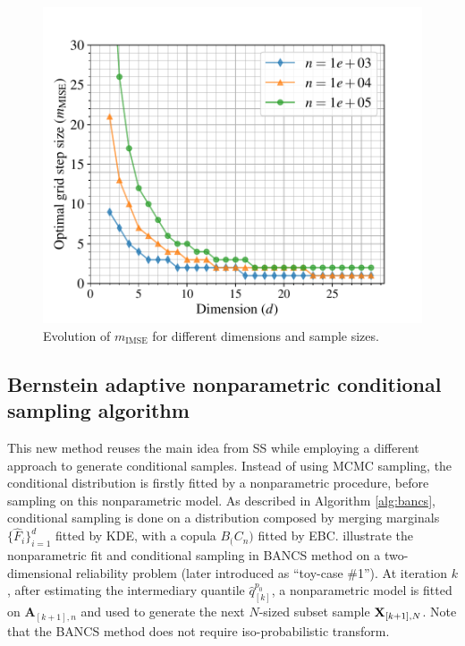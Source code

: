 \begin{figure}
    \centering
    \includegraphics[width=0.6\linewidth]{part3/figures/BANCS/hMISE.pdf}
    \caption{Evolution of $m_{\mathrm{IMSE}}$ for different dimensions and sample sizes.}
    \label{fig:hmise}
\end{figure}


\subsection{Bernstein adaptive nonparametric conditional sampling algorithm}

This new method reuses the main idea from SS while employing a different approach to generate conditional samples. 
Instead of using MCMC sampling, the conditional distribution is firstly fitted by a nonparametric procedure, before sampling on this nonparametric model. 
As described in Algorithm \ref{alg:bancs}, conditional sampling is done on a distribution composed by merging marginals $\{\widehat{F}_i\}_{i=1}^d$ fitted by KDE, with a copula  $B_\bm(C_n)$ fitted by EBC. 
 illustrate the nonparametric fit and conditional sampling in BANCS method on a two-dimensional reliability problem (later introduced as ``toy-case \#1''). 
At iteration $k$, after estimating the intermediary quantile $\widehat{q}_{[k]}^{p_0}$, a nonparametric model is fitted on $\mathbf{A}_{[k+1], n}$ and used to generate the next $N$-sized subset sample ${\bf X}_{[k+1], N}$. 
Note that the BANCS method does not require iso-probabilistic transform.

